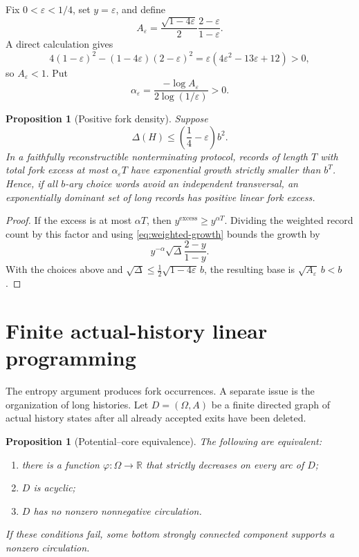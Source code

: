 \documentclass[11pt]{article}
\newtheorem{proposition}[theorem]{Proposition}
\begin{document}
Fix \(0<\varepsilon<1/4\), set \(y=\varepsilon\), and define
\[
  A_\varepsilon
  =\frac{\sqrt{1-4\varepsilon}}2
    \frac{2-\varepsilon}{1-\varepsilon}.
\]
A direct calculation gives
\[
  4(1-\varepsilon)^2
  -(1-4\varepsilon)(2-\varepsilon)^2
  =\varepsilon(4\varepsilon^2-13\varepsilon+12)>0,
\]
so \(A_\varepsilon<1\).  Put
\[
  \alpha_\varepsilon
  =\frac{-\log A_\varepsilon}{2\log(1/\varepsilon)}>0.
\]

\begin{proposition}[Positive fork density]\label{prop:fork-density}
Suppose
\[
  \Delta(H)\le\left(\frac14-\varepsilon\right)b^2.
\]
In a faithfully reconstructible nonterminating protocol, records of length
\(T\) with total fork excess at most \(\alpha_\varepsilon T\) have exponential
growth strictly smaller than \(b^T\).  Hence, if all \(b\)-ary choice words
avoid an independent transversal, an exponentially dominant set of long
records has positive linear fork excess.
\end{proposition}

\begin{proof}
If the excess is at most \(\alpha T\), then
\(y^{\mathrm{excess}}\ge y^{\alpha T}\).  Dividing the weighted record count by
this factor and using \cref{eq:weighted-growth} bounds the growth by
\[
  y^{-\alpha}\sqrt\Delta\frac{2-y}{1-y}.
\]
With the choices above and
\(\sqrt\Delta\le\tfrac12\sqrt{1-4\varepsilon}\,b\), the resulting base is
\(\sqrt{A_\varepsilon}\,b<b\).
\end{proof}

\section{Finite actual-history linear programming}

The entropy argument produces fork occurrences.  A separate issue is the
organization of long histories.  Let \(D=(\Omega,A)\) be a finite directed
graph of actual history states after all already accepted exits have been
deleted.

\begin{proposition}[Potential--core equivalence]\label{prop:potential-core}
The following are equivalent:
\begin{enumerate}[label=(\roman*)]
\item there is a function \(\varphi:\Omega\to\mathbb R\) that strictly
decreases on every arc of \(D\);
\item \(D\) is acyclic;
\item \(D\) has no nonzero nonnegative circulation.
\end{enumerate}
If these conditions fail, some bottom strongly connected component supports a
nonzero circulation.
\end{proposition}
\end{document}
